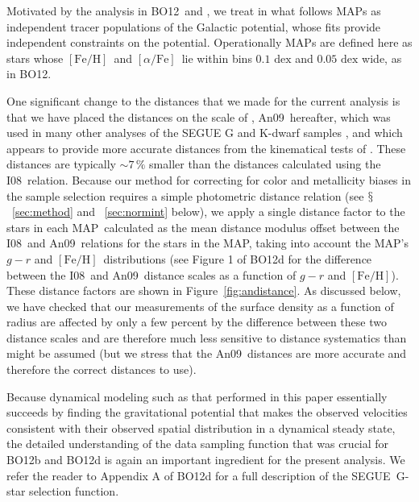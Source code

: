 \documentclass{emulateapj}
\newcommand{\eg}{e.g.}
\renewcommand{\figurename}{Figure}
\newcommand{\sectionname}{$\mathsection$}
\newcommand{\segue}{SEGUE}
\newcommand{\feh}{\ensuremath{[\mathrm{Fe/H}]}}
\newcommand{\afe}{\ensuremath{[\alpha\mathrm{/Fe}]}}
\newcommand{\map}{MAP}
\newcommand{\dex}{\ensuremath{\,\mathrm{dex}}}
\newcommand{\bo}{BO12}
\newcommand{\iv}{I08}
\newcommand{\an}{An09}
\begin{document}
Motivated by the analysis in \bo\ and \citet{Ting13a}, we treat in
what follows \map s as independent tracer populations of the Galactic
potential, whose fits provide independent constraints on the
potential. Operationally \map s are defined here as stars whose
\feh\ and \afe\ lie within bins $0.1\,\dex$ and $0.05\,\dex$ wide, as
in \bo.

One significant change to the distances that we made for the current
analysis is that we have placed the distances on the scale of
\citet{An09a}, \an\ hereafter, which was used in many other analyses
of the SEGUE G and K-dwarf samples
\citep[\eg,][]{Schlesinger12a,Zhang13a}, and which appears to 
provide more accurate distances from the kinematical tests of
\citet{Schoenrich12a}. These distances are typically $\sim\!7\,\%$
smaller than the distances calculated using the \iv\ relation. Because
our method for correcting for color and metallicity biases in the
sample selection requires a simple photometric distance relation (see
\sectionname~\ref{sec:method} and \appendixname~\ref{sec:normint}
below), we apply a single distance factor to the stars in each
\map\ calculated as the mean distance modulus offset between the
\iv\ and \an\ relations for the stars in the \map, taking into account
the \map's $g-r$ and \feh\ distributions (see Figure 1 of \bo d for
the difference between the \iv\ and \an\ distance scales as a function
of $g-r$ and \feh). These distance factors are shown in
\figurename~\ref{fig:andistance}. As discussed below, we have checked
that our measurements of the surface density as a function of radius
are affected by only a few percent by the difference between these two
distance scales and are therefore much less sensitive to distance
systematics than might be assumed (but we stress that the
\an\ distances are more accurate and therefore the correct distances
to use).

Because dynamical modeling such as that performed in this paper
essentially succeeds by finding the gravitational potential that makes
the observed velocities consistent with their observed spatial
distribution in a dynamical steady state, the detailed understanding
of the data sampling function that was crucial for \bo b and \bo d is
again an important ingredient for the present analysis. We refer the
reader to Appendix A of \bo d for a full description of the
\segue\ G-star selection function.
\end{document}
